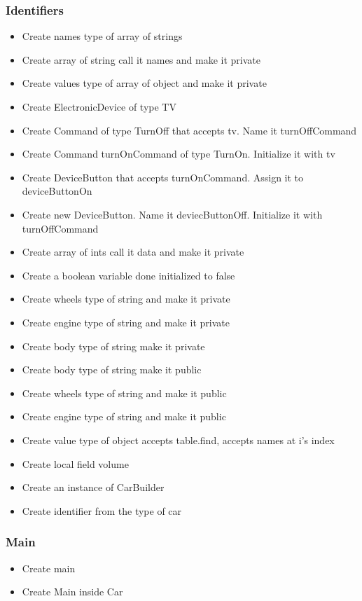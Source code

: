 \subsubsection{Identifiers}
\begin{itemize}
	\item Create names type of array of strings
	\item Create array of string call it names and make it private
	\item Create values type of array of object and make it private
	\item Create ElectronicDevice of type TV
	\item Create Command of type TurnOff that accepts tv. Name it turnOffCommand
	\item Create Command turnOnCommand of type TurnOn. Initialize it with tv
	\item Create DeviceButton that accepts turnOnCommand. Assign it to deviceButtonOn
	\item Create new DeviceButton. Name it deviecButtonOff. Initialize it with turnOffCommand
	\item Create array of ints call it data and make it private
	\item Create a boolean variable done initialized to false
	\item Create wheels type of string and make it private
	\item Create engine type of string and make it private
	\item Create body type of string make it private
	\item Create body type of string make it public
	\item Create wheels type of string and make it public
	\item Create engine type of string and make it public
	\item Create value type of object accepts table.find, accepts names at i’s index
	\item Create local field volume
	\item Create an instance of CarBuilder
	\item Create identifier from the type of car
\end{itemize}
\subsubsection{Main}
\begin{itemize}
	\item Create main
	\item Create Main inside Car
\end{itemize}